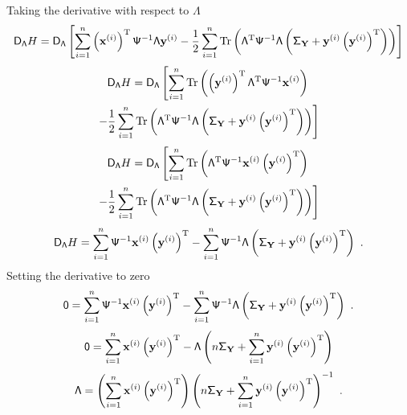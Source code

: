 \documentclass[12pt]{report}
\DeclareMathOperator{\trace}{Tr}
\newcommand{\T}{^\textup{T}}
\newcommand{\vect}[1]{\mathbf{#1}}
\newcommand{\matr}[1]{\mathsf{#1}}
\begin{document}
Taking the derivative with respect to $\matr{\Lambda}$
\begin{equation*}
\matr{D}_{\matr{\Lambda}}H=
\matr{D}_{\matr{\Lambda}}\left[
\sum_{i=1}^n\left(\vect{x}^{(i)}\right)\T\matr{\Psi}^{-1}\matr{\Lambda}\vect{y}^{(i)}
-\frac{1}{2}\sum_{i=1}^{n}\trace\left(\matr{\Lambda}\T\matr{\Psi}^{-1}\matr{\Lambda}\left(\matr{\Sigma}_{\vect{Y}}+\vect{y}^{(i)}\left(\vect{y}^{(i)}\right)\T\right)\right)
\right]
\end{equation*}
\begin{multline*}
\matr{D}_{\matr{\Lambda}}H=
\matr{D}_{\matr{\Lambda}}\left[
\sum_{i=1}^n\trace\left(\left(\vect{y}^{(i)}\right)\T\matr{\Lambda}\T\matr{\Psi}^{-1}\vect{x}^{(i)}\right)
\right.
\\
\left.
-\frac{1}{2}\sum_{i=1}^{n}\trace\left(\matr{\Lambda}\T\matr{\Psi}^{-1}\matr{\Lambda}\left(\matr{\Sigma}_{\vect{Y}}+\vect{y}^{(i)}\left(\vect{y}^{(i)}\right)\T\right)\right)
\right]
\end{multline*}
\begin{multline*}
\matr{D}_{\matr{\Lambda}}H=
\matr{D}_{\matr{\Lambda}}\left[
\sum_{i=1}^n\trace\left(\matr{\Lambda}\T\matr{\Psi}^{-1}\vect{x}^{(i)}\left(\vect{y}^{(i)}\right)\T\right)
\right.
\\
\left.
-\frac{1}{2}\sum_{i=1}^{n}\trace\left(\matr{\Lambda}\T\matr{\Psi}^{-1}\matr{\Lambda}\left(\matr{\Sigma}_{\vect{Y}}+\vect{y}^{(i)}\left(\vect{y}^{(i)}\right)\T\right)\right)
\right]
\end{multline*}
\begin{equation*}
\matr{D}_{\matr{\Lambda}}H=
\sum_{i=1}^n\matr{\Psi}^{-1}\vect{x}^{(i)}\left(\vect{y}^{(i)}\right)\T
-\sum_{i=1}^{n}\matr{\Psi}^{-1}\matr{\Lambda}\left(\matr{\Sigma}_{\vect{Y}}+\vect{y}^{(i)}\left(\vect{y}^{(i)}\right)\T\right) \ .
\end{equation*}
Setting the derivative to zero
\begin{equation*}
\matr{0}=
\sum_{i=1}^n\matr{\Psi}^{-1}\vect{x}^{(i)}\left(\vect{y}^{(i)}\right)\T
-\sum_{i=1}^{n}\matr{\Psi}^{-1}\matr{\Lambda}\left(\matr{\Sigma}_{\vect{Y}}+\vect{y}^{(i)}\left(\vect{y}^{(i)}\right)\T\right) \ .
\end{equation*}
\begin{equation*}
\matr{0}=
\sum_{i=1}^n\vect{x}^{(i)}\left(\vect{y}^{(i)}\right)\T
-\matr{\Lambda}\left(n\matr{\Sigma}_{\vect{Y}}+\sum_{i=1}^{n}\vect{y}^{(i)}\left(\vect{y}^{(i)}\right)\T\right)
\end{equation*}
\begin{equation}
\matr{\Lambda}
=
\left(\sum_{i=1}^n\vect{x}^{(i)}\left(\vect{y}^{(i)}\right)\T\right)\left(n\matr{\Sigma}_{\vect{Y}}+\sum_{i=1}^{n}\vect{y}^{(i)}\left(\vect{y}^{(i)}\right)\T\right)^{-1}\ .
\end{equation}
\end{document}
